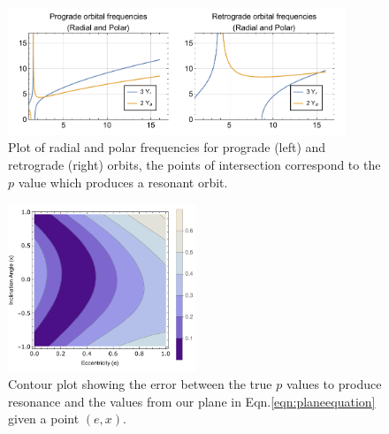 \begin{figure}
    \centering
    \includegraphics[width=0.9\textwidth]{images/proretfreqplots.pdf}
    \caption[Plot of radial and polar frequencies for prograde and retrograde orbits]{Plot of radial and polar frequencies for prograde (left) and retrograde (right) orbits, the points of intersection correspond to the $p$ value which produces a resonant orbit.}
    \label{fig:proretfreqs}
\end{figure}

\begin{figure}
    \centering
    \includegraphics[width=0.5\textwidth]{images/planeErr.pdf}
    \caption[Contour plot of estimation error]{Contour plot showing the error between the true $p$ values to produce resonance and the values from our plane in Eqn.\eqref{eqn:planeequation} given a point $(e,x)$.}
    \label{fig:planeErr}
\end{figure}